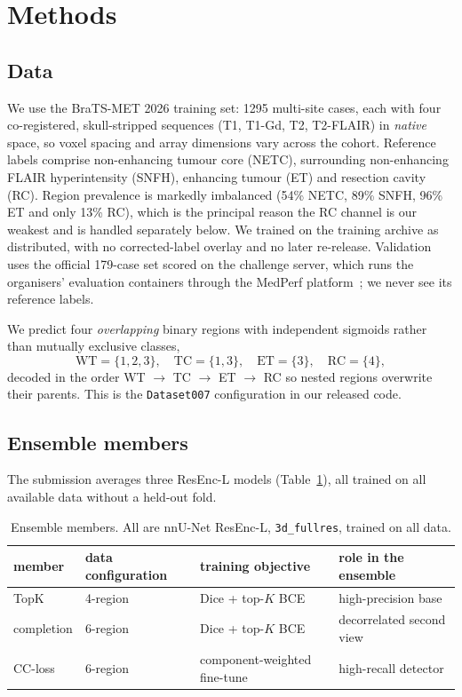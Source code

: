 \documentclass[runningheads]{llncs}
\begin{document}
\section{Methods}
\label{sec:methods}

\subsection{Data}
\label{sec:data}

We use the BraTS-MET 2026 training set: 1295 multi-site cases, each with four co-registered,
skull-stripped sequences (T1, T1-Gd, T2, T2-FLAIR) in \emph{native} space, so voxel spacing and
array dimensions vary across the cohort. Reference labels comprise non-enhancing
tumour core (NETC), surrounding non-enhancing FLAIR hyperintensity (SNFH), enhancing tumour (ET)
and resection cavity (RC). Region prevalence is markedly imbalanced (54\% NETC, 89\% SNFH,
96\% ET and only 13\% RC), which is the principal reason the RC channel is our weakest and is
handled separately below. We trained on the training archive as distributed, with no
corrected-label overlay and no later re-release. Validation uses the official 179-case set scored on the challenge
server, which runs the organisers' evaluation containers through the MedPerf
platform~\cite{medperf2023}; we never see its reference labels.

We predict four \emph{overlapping} binary regions with independent sigmoids rather than mutually
exclusive classes,
\[
\mathrm{WT}=\{1,2,3\},\quad \mathrm{TC}=\{1,3\},\quad \mathrm{ET}=\{3\},\quad \mathrm{RC}=\{4\},
\]
decoded in the order WT $\rightarrow$ TC $\rightarrow$ ET $\rightarrow$ RC so nested regions
overwrite their parents. This is the \texttt{Dataset007} configuration in our released code.

\subsection{Ensemble members}
\label{sec:members}

The submission averages three ResEnc-L models (Table~\ref{tab:members}), all trained on all
available data without a held-out fold.

\begin{table}[t]
\centering
\caption{Ensemble members. All are nnU-Net ResEnc-L, \texttt{3d\_fullres}, trained on all data.}
\label{tab:members}
\begin{tabular}{@{}llll@{}}
\toprule
member & data configuration & training objective & role in the ensemble \\
\midrule
TopK        & 4-region  & Dice + top-$K$ BCE          & high-precision base \\
completion  & 6-region  & Dice + top-$K$ BCE          & decorrelated second view \\
CC-loss     & 6-region  & component-weighted fine-tune & high-recall detector \\
\bottomrule
\end{tabular}
\end{table}
\end{document}
